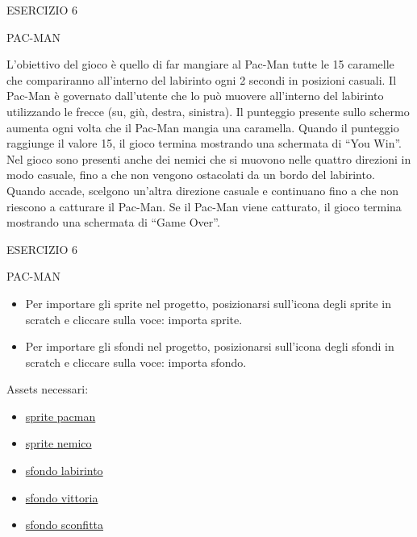 \documentclass[aspectratio=1610]{beamer}
\begin{document}
\begin{frame}{ESERCIZIO 6}
    \begin{alertblock}{PAC-MAN}
        \begin{minipage}{0.96\linewidth}
            L'obiettivo del gioco è quello di far mangiare al Pac-Man tutte le 15 caramelle che compariranno all'interno del labirinto ogni 2 secondi in posizioni casuali. 
            Il Pac-Man è governato dall'utente che lo può muovere all'interno del labirinto utilizzando le frecce (su, giù, destra, sinistra). Il punteggio presente sullo schermo 
            aumenta ogni volta che il Pac-Man mangia una caramella. Quando il punteggio raggiunge il valore 15, il gioco termina mostrando una schermata di ``You Win''. Nel gioco sono presenti anche dei nemici 
            che si muovono nelle quattro direzioni in modo casuale, fino a che non vengono ostacolati da un bordo del labirinto. Quando accade, scelgono un'altra direzione casuale e continuano fino a che non riescono 
            a catturare il Pac-Man. Se il Pac-Man viene catturato, il gioco termina mostrando una schermata di ``Game Over''.
        \end{minipage}
    \end{alertblock}
\end{frame}

\begin{frame}{ESERCIZIO 6}
    \begin{alertblock}{PAC-MAN}
        \begin{minipage}{0.96\linewidth}
            \begin{itemize}
                \justifying
                    \item Per importare gli sprite nel progetto, posizionarsi sull'icona degli sprite in scratch e cliccare sulla voce: importa sprite.
                    \item Per importare gli sfondi nel progetto, posizionarsi sull'icona degli sfondi in scratch e cliccare sulla voce: importa sfondo.
            \end{itemize}
            Assets necessari:
            \begin{itemize}
                \justifying
                \item \href{assets/esercizio6/pacman.sprite3}{sprite pacman}
                \item \href{assets/esercizio6/nemico.sprite3}{sprite nemico}
                \item \href{assets/esercizio6/labirinto.svg}{sfondo labirinto}
                \item \href{assets/esercizio6/youWin.svg}{sfondo vittoria}
                \item \href{assets/esercizio6/gameOver.svg}{sfondo sconfitta}
            \end{itemize}
        \end{minipage}
    \end{alertblock}
\end{frame}
\end{document}
